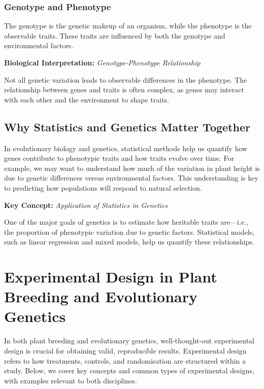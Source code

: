 \documentclass[12pt,a4paper]{article}
\newenvironment{keyconceptbox}[1][]
{\begin{basebox}[linecolor=uqblue]
\textbf{\color{uqblue}Key Concept:} \textit{#1}\par\noindent\ignorespaces}
{\end{basebox}}
\newenvironment{interpretation}[1][]
{\begin{basebox}[linecolor=uqgreen]
\textbf{\color{uqgreen}Biological Interpretation:} \textit{#1}\par\noindent\ignorespaces}
{\end{basebox}}
\begin{document}
\subsubsection{Genotype and Phenotype}

The genotype is the genetic makeup of an organism, while the phenotype is the observable traits. These traits are influenced by both the genotype and environmental factors.

\begin{interpretation}[Genotype-Phenotype Relationship]
Not all genetic variation leads to observable differences in the phenotype. The relationship between genes and traits is often complex, as genes may interact with each other and the environment to shape traits.
\end{interpretation}

\subsection{Why Statistics and Genetics Matter Together}

In evolutionary biology and genetics, statistical methods help us quantify how genes contribute to phenotypic traits and how traits evolve over time. For example, we may want to understand how much of the variation in plant height is due to genetic differences versus environmental factors. This understanding is key to predicting how populations will respond to natural selection.

\begin{keyconceptbox}[Application of Statistics in Genetics]
One of the major goals of genetics is to estimate how heritable traits are—i.e., the proportion of phenotypic variation due to genetic factors. Statistical models, such as linear regression and mixed models, help us quantify these relationships.
\end{keyconceptbox}

\section{Experimental Design in Plant Breeding and Evolutionary Genetics}

In both plant breeding and evolutionary genetics, well-thought-out experimental design is crucial for obtaining valid, reproducible results. Experimental design refers to how treatments, controls, and randomisation are structured within a study. Below, we cover key concepts and common types of experimental designs, with examples relevant to both disciplines.
\end{document}
